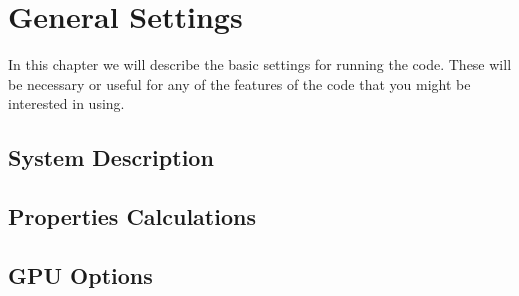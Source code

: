 \chapter{General Settings}

In this chapter we will describe the basic
settings for running the code. These will
be necessary or useful for any of the features
of the code that you might be interested in
using.

\section{System Description}



\section{Properties Calculations}



\section{GPU Options}


